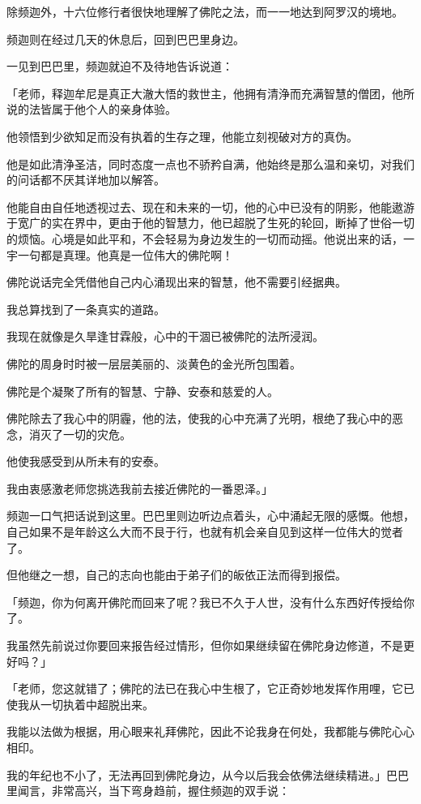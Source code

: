 \documentclass[twoside,openany]{book}
\begin{document}
除频迦外，十六位修行者很快地理解了佛陀之法，而一一地达到阿罗汉的境地。

频迦则在经过几天的休息后，回到巴巴里身边。

一见到巴巴里，频迦就迫不及待地告诉说道：

「老师，释迦牟尼是真正大澈大悟的救世主，他拥有清浄而充满智慧的僧团，他所说的法皆属于他个人的亲身体验。

他领悟到少欲知足而没有执着的生存之理，他能立刻视破对方的真伪。

他是如此清浄圣洁，同时态度一点也不骄矜自满，他始终是那么温和亲切，对我们的问话都不厌其详地加以解答。

他能自由自任地透视过去、现在和未来的一切，他的心中已没有的阴影，他能遨游于宽广的实在界中，更由于他的智慧力，他已超脱了生死的轮回，断掉了世俗一切的烦恼。心境是如此平和，不会轻易为身边发生的一切而动摇。他说出来的话，一宇一句都是真理。他真是一位伟大的佛陀啊！

佛陀说话完全凭借他自己内心涌现出来的智慧，他不需要引经据典。

我总算找到了一条真实的道路。

我现在就像是久旱逢甘霖般，心中的干涸已被佛陀的法所浸润。

佛陀的周身时时被一层层美丽的、淡黄色的金光所包围着。

佛陀是个凝聚了所有的智慧、宁静、安泰和慈爱的人。

佛陀除去了我心中的阴霾，他的法，使我的心中充满了光明，根绝了我心中的恶念，消灭了一切的灾危。

他使我感受到从所未有的安泰。

我由衷感激老师您挑选我前去接近佛陀的一番恩泽。」

频迦一口气把话说到这里。巴巴里则边听边点着头，心中涌起无限的感慨。他想，自己如果不是年龄这么大而不艮于行，也就有机会亲自见到这样一位伟大的觉者了。

但他继之一想，自己的志向也能由于弟子们的皈依正法而得到报偿。

「频迦，你为何离开佛陀而回来了呢？我已不久于人世，没有什么东西好传授给你了。

我虽然先前说过你要回来报告经过情形，但你如果继续留在佛陀身边修道，不是更好吗？」

「老师，您这就错了；佛陀的法已在我心中生根了，它正奇妙地发挥作用哩，它已使我从一切执着中超脱出来。

我能以法做为根据，用心眼来礼拜佛陀，因此不论我身在何处，我都能与佛陀心心相印。

我的年纪也不小了，无法再回到佛陀身边，从今以后我会依佛法继续精进。」巴巴里闻言，非常高兴，当下弯身趋前，握住频迦的双手说：
\end{document}
